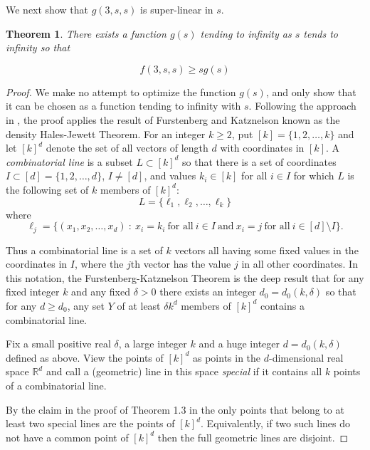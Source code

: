 \documentclass[11pt]{article}
\theoremstyle{plain}
\newtheorem{theorem}{Theorem}[section]
\theoremstyle{definition}
\theoremstyle{remark}
\begin{document}
\iffalse
We next show that $g(3,s,s)$ is super-linear in $s$.

\begin{theorem}

There exists a function $g(s)$ tending to infinity as $s$ tends to
infinity so that

$$f(3,s,s) \geq sg(s)$$
    
\end{theorem}

\begin{proof}
We make no attempt to optimize the function $g(s)$, and only
show that it can be chosen as a function tending to infinity with
$s$.  Following the approach in \cite{Alon2012}, the proof applies
the result of Furstenberg and Katznelson \cite{FK1991}
known as the density Hales-Jewett Theorem.  For an integer $k \geq
2$, put $[k]=\{1,2,\ldots ,k\}$ and let $[k]^d$ denote the set of
all vectors of length $d$ with coordinates in $[k]$. A {\em
combinatorial line} is a subset $L \subset [k]^d$ so that there is a
set of coordinates $I \subset [d]=\{1,2,\ldots ,d\}$, $I \neq [d]$,
and values $k_i \in [k]$ for all $i \in I$
for which $L$ is the following set of $k$ members of $[k]^d$:
$$
L=\{\ell_1,\ell_2,\ldots,\ell_k\}
$$
where
$$
\ell_j=\{(x_1,x_2, \ldots ,x_d)~:~x_i=k_i~\mbox{for all}~ i \in I~
\mbox{and}~x_i=j~\mbox{for all}~ i \in [d] \setminus I\}.
$$

Thus a combinatorial line is a set of $k$ vectors  all having some fixed
values in the coordinates in $I$, where the $j$th vector has the value $j$
in all other coordinates.  In this notation, the Furstenberg-Katznelson
Theorem is 
the deep result that for any fixed integer $k$ and any fixed $\delta>0$
there exists an integer $d_0=d_0(k,\delta)$ so that for any $d \geq
d_0$, any set $Y$ of at least $\delta k^d$ members of $[k]^d$ contains
a combinatorial line.

Fix a small positive real $\delta$, a large integer $k$ and a huge
integer $d =d_0(k,\delta)$ defined as above. View the points of $[k]^d$
as points in the $d$-dimensional real space $\mathbb{R}^d$ and call a
(geometric) line in this space {\em special} if it contains all $k$
points of a combinatorial line.

By the claim in the proof of Theorem 1.3 in \cite{Alon2012} the only
points that belong to at least two special lines are the points of
$[k]^d.$ Equivalently, if two such lines do not have a common point of
$[k]^d$ then the full geometric lines are disjoint.


\end{proof}
\end{document}
